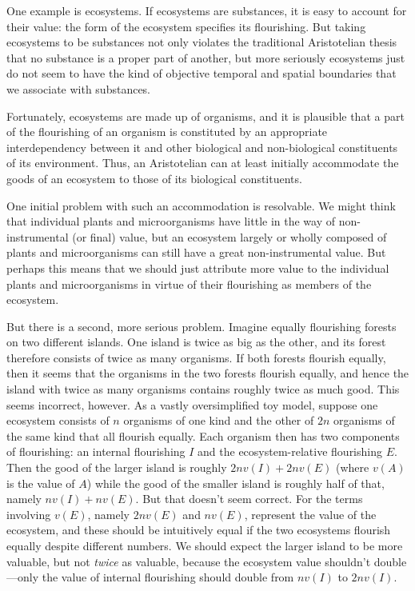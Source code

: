 One example is ecosystems. If ecosystems are substances, it is easy to account for their value: 
the form of the ecosystem specifies its flourishing. But
taking ecosystems to be substances not only violates the traditional Aristotelian thesis that no substance
is a proper part of another, but more seriously ecosystems just do not seem to have the kind of objective 
temporal and spatial boundaries that we associate with substances. 

Fortunately, ecosystems are made up of organisms, and it is plausible that a part of the flourishing of
an organism is constituted by an appropriate interdependency between it and other biological and 
non-biological constituents of its environment. Thus, an Aristotelian can at least initially accommodate the goods of an ecosystem
to those of its biological constituents. 

One initial problem with such an accommodation is resolvable. We might think that individual plants and microorganisms 
have little in the way of non-instrumental (or final) value, but an ecosystem largely or wholly composed of plants 
and microorganisms can still have a great non-instrumental value. But perhaps this means that we should just 
attribute more value 
to the individual plants and microorganisms in virtue of their flourishing as members of the ecosystem.

But there is a second, more serious problem. Imagine equally flourishing forests on two different islands. 
One island is twice as big as the other, and its forest therefore consists of twice as many organisms. If
both forests flourish equally, then it seems that the organisms in the two forests flourish equally, and
hence the island with twice as many organisms contains roughly twice as much good. This seems incorrect, however. 
As a vastly oversimplified toy model, suppose one ecosystem consists of $n$ organisms of one kind and the other of $2n$ organisms
of the same kind that all flourish equally. Each organism then has two components of flourishing: an internal 
flourishing $I$ and the ecosystem-relative flourishing $E$. Then the good of the larger island is roughly
$2n v(I)+2n v(E)$ (where $v(A)$ is the value of $A$) while the good of the smaller island is roughly half of that,
namely $n v(I)+nv(E)$. But that doesn't seem correct. For the terms involving $v(E)$, namely $2n v(E)$ and
$n v(E)$, represent the value of the ecosystem, and these should be intuitively equal if the two ecosystems
flourish equally despite different numbers. We should expect the larger island to be more valuable, but not
\textit{twice} as valuable, because the ecosystem value shouldn't double---only the value of internal
flourishing should double from $nv(I)$ to $2nv(I)$. 

